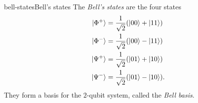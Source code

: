 \begin{topic}{bell-states}{Bell's states}
    The \emph{Bell's states} are the four  states
    \[ \begin{aligned}
        |\Phi^+\rangle &= \frac{1}{\sqrt{2}} (|00\rangle + |11\rangle) \\
        |\Phi^-\rangle &= \frac{1}{\sqrt{2}} (|00\rangle - |11\rangle) \\
        |\Psi^+\rangle &= \frac{1}{\sqrt{2}} (|01\rangle + |10\rangle) \\
        |\Psi^-\rangle &= \frac{1}{\sqrt{2}} (|01\rangle - |10\rangle) .
    \end{aligned} \]
    They form a basis for the $2$-qubit system, called the \textit{Bell basis}.
\end{topic}
